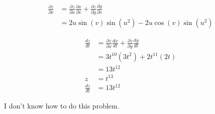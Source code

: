 \documentclass[8pt]{extarticle}
\begin{document}
\begin{problem}{14.6}
\begin{description}[font=\normalfont]
\begin{align*}
          \frac{\partial z}{\partial v} &= \frac{\partial z}{\partial x}\frac{\partial x}{\partial v} + \frac{\partial z}{\partial y}\frac{\partial y}{\partial v}\\
                                        &= 2u\sin(v)\sin(u^2) - 2u\cos(v)\sin(u^2)
        \end{align*}
      \item[16:]
        \begin{align*}
          \frac{dz}{dt} &= \frac{\partial z}{\partial x}\frac{dx}{dt} + \frac{\partial z}{\partial y}\frac{dy}{dt}\\
                        &= 3t^{10}(3t^2) + 2t^{11}(2t)\\
                        &= 13t^{12}\\
          z &= t^{13}\\
          \frac{dz}{dt} &= 13t^{12}
        \end{align*}
      \item[38:] I don't know how to do this problem.
    \end{description}
  \end{problem}
\end{document}
